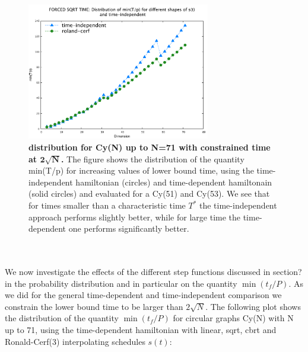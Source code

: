         \begin{figure}[ht]
        \centering
        \includegraphics[width=80mm]{./figures/min_tp_sqrt/forced_delta.pdf}
        \caption[$\min(t_f/P)$ distribution for Cy(N) up to N=71 with constrained time at $\sqrt(N)$.]{\textbf{ distribution for Cy(N) up to N=71 with constrained time at $\bm{2\sqrt{N}}$.} The figure shows the distribution of the quantity min(T/p) for increasing values of lower bound time, using the time-independent hamiltonian (circles) and time-dependent hamiltonain (solid circles) and evaluated for a Cy(51) and Cy(53). We see that for times smaller than a characteristic time $T^*$ the time-independent approach performs slightly better, while for large time the time-dependent one performs significantly better. }
        \label{fig:delta_increasing_time}
        \end{figure} \\ \\
        We now investigate the effects of the different step functions discussed in section? in the probability distribution and in particular on the quantity $\min(t_f/P)$. As we did for the general time-dependent and time-independent comparison we constrain the lower bound time to be larger than $2\sqrt{N}$.
        The following plot shows the distribution of the quantity $\min(t_f/P)$ for circular graphs Cy(N) with N up to 71, using the time-dependent hamiltonian with linear, sqrt, cbrt and Ronald-Cerf(3) interpolating schedules $s(t)$:
